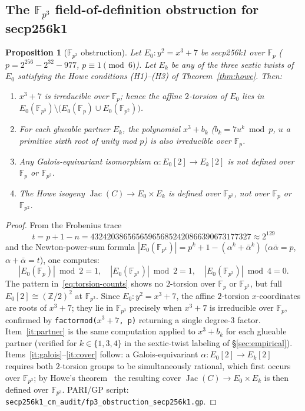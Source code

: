 \documentclass[11pt,a4paper]{article}
\newtheorem{proposition}[theorem]{Proposition}
\theoremstyle{definition}
\newcommand{\FF}{\mathbb{F}}
\newcommand{\ZZ}{\mathbb{Z}}
\newcommand{\Jac}{\operatorname{Jac}}
\begin{document}
\subsection*{The $\FF_{p^3}$ field-of-definition obstruction for secp256k1}

\begin{proposition}[$\FF_{p^3}$ obstruction]\label{prop:fp3obs}
Let $E_0\colon y^2 = x^3 + 7$ be secp256k1 over $\FF_p$
\textup{(}$p = 2^{256} - 2^{32} - 977$, $p \equiv 1 \pmod 6$\textup{)}.
Let $E_k$ be any of the three sextic twists of $E_0$ satisfying the
Howe conditions \textup{(H1)--(H3)} of Theorem~\ref{thm:howe}.  Then:
\begin{enumerate}[label=\textup{(\roman*)}]
\item\label{it:irred} $x^3 + 7$ is irreducible over $\FF_p$; hence the
      affine $2$-torsion of $E_0$ lies in
      $E_0(\FF_{p^3}) \setminus \bigl(E_0(\FF_p) \cup E_0(\FF_{p^2})\bigr)$.
\item\label{it:partner} For each glueable partner $E_k$, the polynomial
      $x^3 + b_k$ \textup{(}$b_k = 7u^k \bmod p$, $u$ a primitive sixth
      root of unity mod $p$\textup{)} is also irreducible over $\FF_p$.
\item\label{it:galois} Any Galois-equivariant isomorphism
      $\alpha\colon E_0[2] \to E_k[2]$ is not defined over $\FF_p$
      or $\FF_{p^2}$.
\item\label{it:cover} The Howe isogeny $\Jac(C) \to E_0 \times E_k$
      is defined over $\FF_{p^3}$, not over $\FF_p$ or $\FF_{p^2}$.
\end{enumerate}
\end{proposition}

\begin{proof}
From the Frobenius trace
\[
  t = p + 1 - n = 432420386565659656852420866390673177327 \approx 2^{129}
\]
and the Newton-power-sum formula
$|E_0(\FF_{p^k})| = p^k + 1 - (\alpha^k + \bar{\alpha}^k)$
($\alpha\bar{\alpha} = p$, $\alpha + \bar{\alpha} = t$), one computes:
\begin{equation}\label{eq:torsion-counts}
  |E_0(\FF_p)| \bmod 2 = 1, \quad
  |E_0(\FF_{p^2})| \bmod 2 = 1, \quad
  |E_0(\FF_{p^3})| \bmod 4 = 0.
\end{equation}
The pattern in~\eqref{eq:torsion-counts} shows no $2$-torsion over $\FF_p$ or
$\FF_{p^2}$, but full $E_0[2] \cong (\ZZ/2)^2$ at $\FF_{p^3}$.  Since
$E_0\colon y^2 = x^3 + 7$, the affine $2$-torsion $x$-coordinates are
roots of $x^3 + 7$; they lie in $\FF_{p^3}$ precisely when $x^3 + 7$
is irreducible over $\FF_p$, confirmed by
\texttt{factormod($x^3 + 7$,\,p)} returning a single degree-$3$ factor.
Item~\ref{it:partner} is the same computation applied to $x^3 + b_k$
for each glueable partner (verified for $k \in \{1, 3, 4\}$ in the
sextic-twist labeling of \S\ref{sec:empirical}).
Items~\ref{it:galois}--\ref{it:cover} follow: a Galois-equivariant
$\alpha\colon E_0[2] \to E_k[2]$ requires both $2$-torsion groups to
be simultaneously rational, which first occurs over $\FF_{p^3}$; by
Howe's theorem~\cite{howe1996} the resulting cover $\Jac(C) \to
E_0 \times E_k$ is then defined over $\FF_{p^3}$.
PARI/GP script: \texttt{secp256k1\_cm\_audit/fp3\_obstruction\_secp256k1.gp}.
\end{proof}
\end{document}

